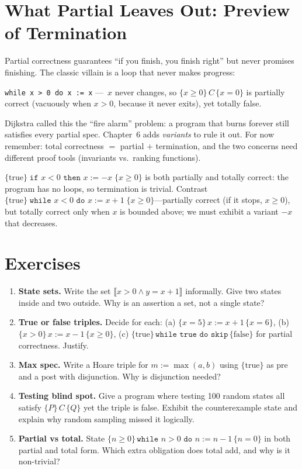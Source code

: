 \section{What Partial Leaves Out: Preview of Termination}
\label{sec:partial-total-preview}
Partial correctness guarantees ``if you finish, you finish right'' but never promises finishing. The classic villain is a loop that never makes progress:
\begin{center}
\texttt{while x > 0 do x := x} \quad---\, $x$ never changes, so $\{x\ge0\}\,C\,\{x=0\}$ is partially correct (vacuously when $x>0$, because it never exits), yet totally false.
\end{center}
Dijkstra called this the ``fire alarm'' problem: a program that burns forever still satisfies every partial spec. Chapter~6 adds \emph{variants} to rule it out. For now remember: total correctness $=$ partial $+$ termination, and the two concerns need different proof tools (invariants vs.\ ranking functions).

\begin{example}
$\{\text{true}\}\;\texttt{if }x<0\texttt{ then }x:=-x\;\{x\ge0\}$ is both partially and totally correct: the program has no loops, so termination is trivial. Contrast $\{\text{true}\}\;\texttt{while }x<0\texttt{ do }x:=x+1\;\{x\ge0\}$—partially correct (if it stops, $x\ge0$), but totally correct only when $x$ is bounded above; we must exhibit a variant $-x$ that decreases.
\end{example}

\section{Exercises}
\label{sec:ch01-exercises}
\begin{enumerate}[label=E1.\arabic*, leftmargin=*, itemsep=0.6em]
    \item \textbf{State sets.} Write the set $\llbracket x>0\land y=x+1\rrbracket$ informally. Give two states inside and two outside. Why is an assertion a set, not a single state?
    \item \textbf{True or false triples.} Decide for each: (a) $\{x=5\}\,x:=x+1\,\{x=6\}$, (b) $\{x>0\}\,x:=x-1\,\{x\ge0\}$, (c) $\{ \text{true}\}\,\texttt{while true do skip}\,\{\text{false}\}$ for partial correctness. Justify.
    \item \textbf{Max spec.} Write a Hoare triple for $m:=\max(a,b)$ using $\{ \text{true}\}$ as pre and a post with disjunction. Why is disjunction needed?
    \item \textbf{Testing blind spot.} Give a program where testing 100 random states all satisfy $\{P\}\,C\,\{Q\}$ yet the triple is false. Exhibit the counterexample state and explain why random sampling missed it logically.
    \item \textbf{Partial vs total.} State $\{n\ge0\}\,\texttt{while }n>0\texttt{ do }n:=n-1\,\{n=0\}$ in both partial and total form. Which extra obligation does total add, and why is it non-trivial?
\end{enumerate}

